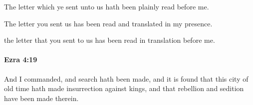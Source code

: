 			\begin{versebox}
					\item[BHS] 
					\item[LXX] 
					\item[ASV] The letter which ye sent unto us hath been plainly read before me.
					\item[NIV] The letter you sent us has been read and translated in my presence.
					\item[NRSV] the letter that you sent to us has been read in translation before me.
			\end{versebox}

		\paragraph{Ezra 4:19} %
			\label{EZRA-4-19}

			And I commanded, and search hath been made, and it is found that this city of old time hath made insurrection against kings, and that rebellion and sedition have been made therein.

